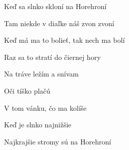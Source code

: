 \begin{song}
\bigskip

Keď sa slnko skloní na Horehroní  \par
{}Tam niekde v diaľke náš zvon zvoní \par
Keď má ma to bolieť, tak nech ma bolí \par
{}Raz sa to stratí do čiernej hory \par

\bigskip

 Na tráve ležím a snívam \par
{} Oči tíško plačú \par
{} V tom vánku, čo ma kolíše \par
{} Keď je slnko najnižšie  \par

\bigskip

 \par
{} Najkrajšie stromy sú na Horehroní  \par

\end{song}
